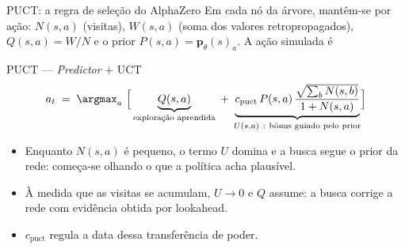 \documentclass[aspectratio=169, 10pt]{beamer}
\newcommand{\cpuct}{c_{\mathrm{puct}}}
\newcommand{\Nvis}{N}
\newcommand{\Wtot}{W}
\newcommand{\redepol}{\bm{p}_{\theta}}
\begin{document}
\begin{frame}{PUCT: a regra de seleção do AlphaZero}
  \small
  Em cada nó da árvore, mantêm-se por ação: $\Nvis(s,a)$ (visitas),
  $\Wtot(s,a)$ (soma dos valores retropropagados), $Q(s,a)=\Wtot/\Nvis$ e o prior
  $P(s,a) = \redepol(s)_a$. A ação simulada é

  \begin{teobox}{PUCT --- \emph{Predictor} $+$ UCT}
    \[
      a_t \;=\; \argmax_{a}\ \Bigl[\, \underbrace{Q(s,a)}_{\text{exploração aprendida}}
      \;+\; \underbrace{\cpuct\, P(s,a)\,\frac{\sqrt{\sum_b \Nvis(s,b)}}{1+\Nvis(s,a)}}_{U(s,a)\ :\ \text{bônus guiado pelo prior}} \Bigr]
    \]
  \end{teobox}

  \begin{itemize}
    \item Enquanto $\Nvis(s,a)$ é pequeno, o termo $U$ domina e a busca segue o
          \alert{prior da rede}: começa-se olhando o que a política acha plausível.
    \item À medida que as visitas se acumulam, $U \to 0$ e $Q$ assume: a busca
          \alert{corrige} a rede com evidência obtida por lookahead.
    \item $\cpuct$ regula a data dessa transferência de poder.
  \end{itemize}
\end{frame}
\end{document}
